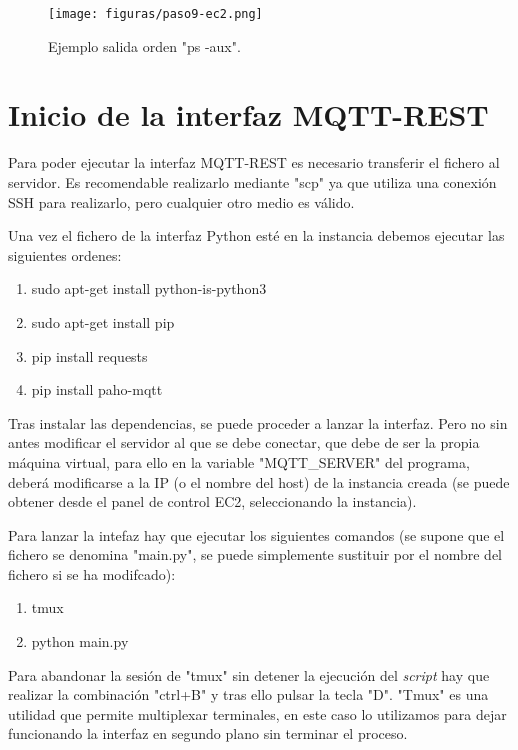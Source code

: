 \documentclass{scrbook}
\begin{document}
\begin{figure}[htb]  
\begin{center}
\label{fig:paso9-ec2}
\texttt{[image: figuras/paso9-ec2.png]}
\caption{Ejemplo salida orden "ps -aux".} 
\end{center}
\end{figure}
\section{Inicio de la interfaz MQTT-REST}
Para poder ejecutar la interfaz MQTT-REST es necesario transferir el fichero al servidor. Es recomendable realizarlo mediante "scp" ya que utiliza una conexión SSH para realizarlo, pero cualquier otro medio es válido.

Una vez el fichero de la interfaz Python esté en la instancia debemos ejecutar las siguientes ordenes:

\begin{enumerate}
    \item sudo apt-get install python-is-python3
    \item sudo apt-get install pip
    \item pip install requests
    \item pip install paho-mqtt
\end{enumerate}

Tras instalar las dependencias, se puede proceder a lanzar la interfaz. Pero no sin antes modificar el servidor al que se debe conectar, que debe de ser la propia máquina virtual, para ello en la variable "MQTT\_SERVER" del programa, deberá modificarse a la IP (o el nombre del host) de la instancia creada (se puede obtener desde el panel de control EC2, seleccionando la instancia).

Para lanzar la intefaz hay que ejecutar los siguientes comandos (se supone que el fichero se denomina "main.py", se puede simplemente sustituir por el nombre del fichero si se ha modifcado):

\begin{enumerate}
    \item tmux
    \item python main.py
\end{enumerate}

Para abandonar la sesión de "tmux" sin detener la ejecución del \textit{script} hay que realizar la combinación "ctrl+B" y tras ello pulsar la tecla "D". "Tmux" es una utilidad que permite multiplexar terminales, en este caso lo utilizamos para dejar funcionando la interfaz en segundo plano sin terminar el proceso.
\end{document}
